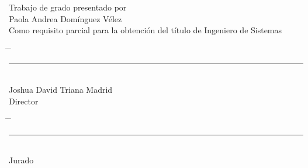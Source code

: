 \begin{titlepage}

\thispagestyle{empty}

    \vspace*{4cm}
    \begin{center}
    Trabajo de grado presentado por\\
    Paola Andrea Domínguez Vélez\\
    Como requisito parcial para la obtención del título de Ingeniero de Sistemas
    \end{center}
    \vfill
    \vfill
    \vfill
    \begin{center}
    \begin{tabbing}
    \hspace{0.05\textwidth} \= \hspace{0.05\textwidth} \= \kill
    \rule{70mm}{0.1mm} \\
    Joshua David Triana Madrid\\
    Director
    \end{tabbing}
    \end{center}
    \vfill
    \vfill
    \vfill
    \begin{center}
    \begin{tabbing}
    \hspace{0.05\textwidth} \= \hspace{0.05\textwidth} \= \kill
    \rule{70mm}{0.1mm} \> \rightline{\rule{70mm}{0.1mm}} \\
    Jurado \> 
    \end{tabbing}
    \end{center}
    \vfill
    \vfill
    \vfill
    \vfill
\end{titlepage}